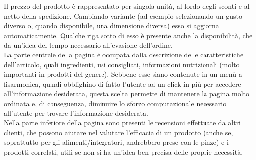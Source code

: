 Il prezzo del prodotto è rappresentato per singola unità, al lordo degli sconti e al netto della spedizione. Cambiando variante (ad esempio selezionando un gusto diverso o, quando disponibile, una dimensione diversa) esso si aggiorna automaticamente. Qualche riga sotto di esso è presente anche la disponibilità, che da un'idea del tempo necessario all'evasione dell'ordine.\\
La parte centrale della pagina è occupata dalla descrizione delle caratteristiche dell'articolo, quali ingredienti, usi consigliati, informazioni nutrizionali (molto importanti in prodotti del genere). Sebbene esse siano contenute in un menù a fisarmonica, quindi obblighino di fatto l'utente ad un click in più per accedere all'informazione desiderata, questa scelta permette di mantenere la pagina molto ordinata e, di conseguenza, diminuire lo sforzo computazionale necessario all'utente per trovare l'informazione desiderata.\\
Nella parte inferiore della pagina sono presenti le recensioni effettuate da altri clienti, che possono aiutare nel valutare l'efficacia di un prodotto (anche se, soprattutto per gli alimenti/integratori, andrebbero prese con le pinze) e i prodotti correlati, utili se non si ha un'idea ben precisa delle proprie necessità.
